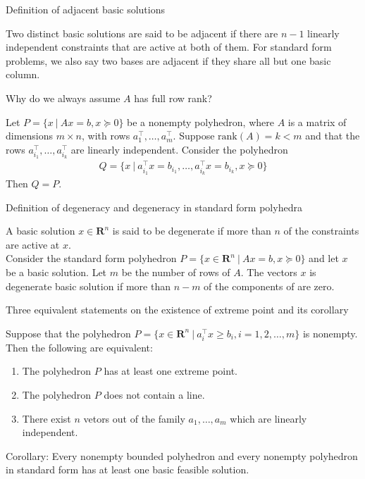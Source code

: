 \documentclass[11pt]{article}
\newcommand{\reals}{\mathbf{R}}
\newcommand*{\xfield}[1]{\begin{mdframed}\centering #1\end{mdframed}\bigskip}
\newenvironment{field}{}{}
\newenvironment{note}{}{}
\begin{document}
%
\begin{note}
  \xfield{Definition of adjacent basic solutions}
  \begin{field}
    Two distinct basic solutions are said to be adjacent if there are
    \(n-1\) linearly independent constraints that are active at both
    of them. For standard form problems, we also say two bases are
    adjacent if they share all but one basic column.
  \end{field}
\end{note}
%
\begin{note}
  \xfield{Why do we always assume \(A\) has full row rank?}
  \begin{field}
    Let \(P = \{x ~|~ Ax = b, x \succeq 0\}\) be a nonempty
    polyhedron, where \(A\) is a matrix of dimensions \(m \times n\),
    with rows \(a^\top_1, \ldots, a^\top_m\). Suppose \(\text{rank}(A) = k <
    m\) and that the rows \(a^\top_{i_1}, \ldots, a^\top_{i_k}\) are
    linearly independent. Consider the polyhedron
    \begin{align*}
      Q = \{ x ~|~ a^\top_{i_1} x = b_{i_1}, \ldots, a^\top_{i_k} x =
      b_{i_k}, x \succeq 0\}
    \end{align*}
    Then \(Q = P\).
  \end{field}
\end{note}
%
\begin{note}
  \xfield{Definition of degeneracy and degeneracy in standard form polyhedra}
  \begin{field}
    A basic solution \(x \in \reals^n\) is said to be degenerate if
    more than \(n\) of the constraints are active at \(x\).
    \\

    Consider the standard form polyhedron \(P = \{x \in \reals^n ~|~
    Ax = b, x \succeq 0\}\) and let \(x\) be a basic solution. Let
    \(m\) be the number of rows of \(A\). The vectors \(x\) is
    degenerate basic solution if more than \(n-m\) of the components
    of are zero.
  \end{field}
\end{note}
%
\begin{note}
  \xfield{Three equivalent statements on the existence of extreme
    point and its corollary}
  \begin{field}
    Suppose that the polyhedron \(P = \{ x \in \reals^n ~|~ a^\top_i x
    \geq b_i, i = 1,2,\ldots,m\}\) is nonempty. Then the following are
    equivalent:
    \begin{enumerate}
    \item The polyhedron \(P\) has at least one extreme point.
    \item The polyhedron \(P\) does not contain a line.
    \item There exist \(n\) vetors out of the family \(a_1, \ldots,
      a_m\) which are linearly independent.
    \end{enumerate}
    Corollary: Every nonempty bounded polyhedron and every nonempty
    polyhedron in standard form has at least one basic feasible
    solution.
  \end{field}
\end{note}
\end{document}
